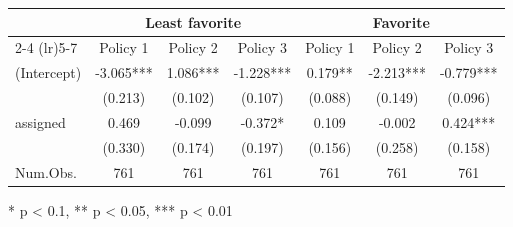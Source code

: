 \begin{tabular*}{\linewidth}{@{\extracolsep{\fill}}lcccccc}
\toprule
 & \multicolumn{3}{c}{{Least favorite}} & \multicolumn{3}{c}{{Favorite}} \\ 
\cmidrule(lr){2-4} \cmidrule(lr){5-7}
  & Policy 1 & Policy 2 & Policy 3 & Policy 1  & Policy 2  & Policy 3  \\ 
\midrule\addlinespace[2.5pt]
(Intercept) & -3.065*** & 1.086*** & -1.228*** & 0.179** & -2.213*** & -0.779*** \\ 
 & (0.213) & (0.102) & (0.107) & (0.088) & (0.149) & (0.096) \\ 
assigned & 0.469 & -0.099 & -0.372* & 0.109 & -0.002 & 0.424*** \\ 
{} & {(0.330)} & {(0.174)} & {(0.197)} & {(0.156)} & {(0.258)} & {(0.158)} \\ 
Num.Obs. & 761 & 761 & 761 & 761 & 761 & 761 \\ 
\bottomrule
\end{tabular*}
\begin{minipage}{\linewidth}
\vspace{.05em}
* p < 0.1, ** p < 0.05, *** p < 0.01\\
\end{minipage}

